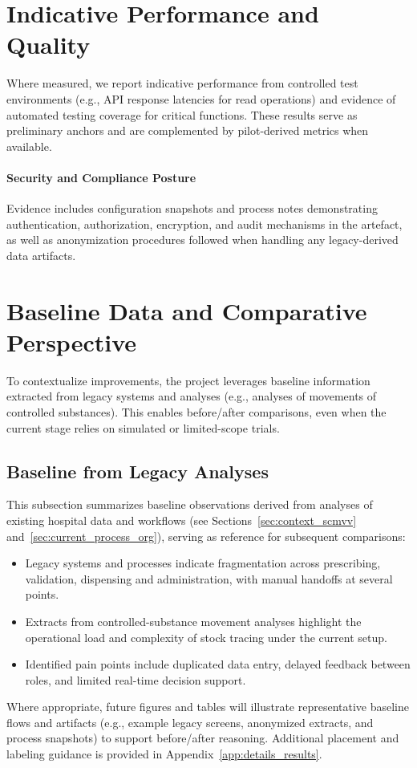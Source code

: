 \section{Indicative Performance and Quality}
Where measured, we report indicative performance from controlled test environments (e.g., API response latencies for read operations) and evidence of automated testing coverage for critical functions. These results serve as preliminary anchors and are complemented by pilot-derived metrics when available.

\paragraph{Security and Compliance Posture}
Evidence includes configuration snapshots and process notes demonstrating authentication, authorization, encryption, and audit mechanisms in the artefact, as well as anonymization procedures followed when handling any legacy-derived data artifacts.

\section{Baseline Data and Comparative Perspective}
To contextualize improvements, the project leverages baseline information extracted from legacy systems and analyses (e.g., analyses of movements of controlled substances). This enables before/after comparisons, even when the current stage relies on simulated or limited-scope trials.

\subsection{Baseline from Legacy Analyses}
This subsection summarizes baseline observations derived from analyses of existing hospital data and workflows (see Sections~\ref{sec:context_scmvv} and~\ref{sec:current_process_org}), serving as reference for subsequent comparisons:
\begin{itemize}
    \item Legacy systems and processes indicate fragmentation across prescribing, validation, dispensing and administration, with manual handoffs at several points.
    \item Extracts from controlled-substance movement analyses highlight the operational load and complexity of stock tracing under the current setup.
    \item Identified pain points include duplicated data entry, delayed feedback between roles, and limited real-time decision support.
\end{itemize}
Where appropriate, future figures and tables will illustrate representative baseline flows and artifacts (e.g., example legacy screens, anonymized extracts, and process snapshots) to support before/after reasoning.
Additional placement and labeling guidance is provided in Appendix~\ref{app:details_results}.

